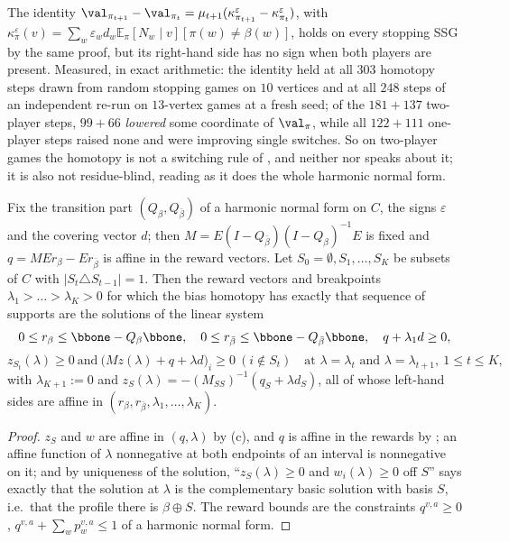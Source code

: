 \begin{proposition}\label{fsa:two-nonmono}
The identity $\val_{\pi_{t+1}}-\val_{\pi_t}=\mu_{t+1}
(\kappa^{\varepsilon}_{\pi_{t+1}}-\kappa^{\varepsilon}_{\pi_t})$, with
$\kappa^{\varepsilon}_\pi(v)=\sum_w\varepsilon_wd_w\mathbb E_\pi[N_w\mid v]
[\pi(w)\ne\beta(w)]$, holds on every stopping SSG by the same proof, but its
right-hand side has no sign when both players are present. Measured, in exact
arithmetic: the identity held at all $303$ homotopy steps drawn from random
stopping games on $10$ vertices and at all $248$ steps of an independent
re-run on $13$-vertex games at a fresh seed; of the $181+137$ two-player
steps, $99+66$ \emph{lowered} some coordinate of $\val_\pi$, while all
$122+111$ one-player steps raised none and were improving single switches. So on two-player games the
homotopy is not a switching rule of , and neither
nor 
speaks about it; it is also not residue-blind, reading as it does the whole
harmonic normal form.
\end{proposition}

\begin{lemma}\label{fsa:path-lp}
Fix the transition part $(Q_\beta,Q_{\bar\beta})$ of a harmonic normal form on
$C$, the signs $\varepsilon$ and the covering vector $d$; then
$M=E(I-Q_{\bar\beta})(I-Q_\beta)^{-1}E$ is fixed and
$q=MEr_\beta-Er_{\bar\beta}$ is affine in the reward vectors. Let
$S_0=\emptyset,S_1,\dots,S_K$ be subsets of $C$ with
$|S_t\triangle S_{t-1}|=1$. Then the reward vectors and breakpoints
$\lambda_1>\dots>\lambda_K>0$ for which the bias homotopy has exactly that
sequence of supports are the solutions of the linear system
\[
  0\le r_{\beta}\le\bbone-Q_\beta\bbone,\quad
  0\le r_{\bar\beta}\le\bbone-Q_{\bar\beta}\bbone,\quad
  q+\lambda_1d\ge0,
\]
\[
  z_{S_t}(\lambda)\ge0\ \text{and}\ \bigl(Mz(\lambda)+q+\lambda d\bigr)_i\ge0\ (i\notin S_t)
  \quad\text{at }\lambda=\lambda_t\text{ and }\lambda=\lambda_{t+1},\ 1\le t\le K,
\]
with $\lambda_{K+1}:=0$ and $z_{S}(\lambda)=-(M_{SS})^{-1}(q_S+\lambda d_S)$,
all of whose left-hand sides are affine in
$(r_\beta,r_{\bar\beta},\lambda_1,\dots,\lambda_K)$.
\end{lemma}

\begin{proof}
$z_S$ and $w$ are affine in $(q,\lambda)$ by
(c), and $q$ is affine in the rewards by
; an affine function of $\lambda$ nonnegative at both
endpoints of an interval is nonnegative on it; and by uniqueness of the
solution, ``$z_{S}(\lambda)\ge0$ and $w_i(\lambda)\ge0$ off $S$'' says exactly
that the solution at $\lambda$ is the complementary basic solution with basis
$S$, i.e.\ that the profile there is $\beta\oplus S$. The reward bounds are
the constraints $q^{v,a}\ge0$, $q^{v,a}+\sum_wp^{v,a}_w\le1$ of a harmonic
normal form.
\end{proof}

